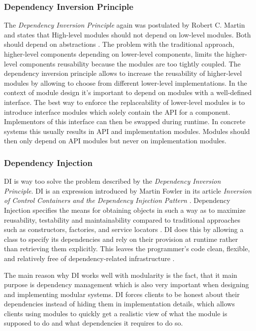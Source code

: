 \subsubsection{Dependency Inversion Principle}
The \textit{Dependency Inversion Principle} again was postulated by Robert C. Martin and states that High-level modules should not depend on low-level modules. Both should depend on abstractions \cite{Martin:2002}. The problem with the traditional approach, higher-level components depending on lower-level components, limits the higher-level components reusability because the modules are too tightly coupled. The dependency inversion principle allows to increase the reusability of higher-level modules by allowing to choose from different lower-level implementations. In the context of module design it's important to depend on modules with a well-defined interface. The best way to enforce the replaceability of lower-level modules is to introduce interface modules which solely contain the \gls{API} for a component. Implementors of this interface can then be swapped during runtime. In concrete systems this usually results in \gls{API} and implementation modules. Modules should then only depend on \gls{API} modules but never on implementation modules.

\subsubsection{Dependency Injection}
\gls{DI} is way too solve the problem described by the \textit{Dependency Inversion Principle}.
\gls{DI} is an expression introduced by Martin Fowler in its article \textit{Inversion of Control Containers and the Dependency Injection Pattern} \cite{Fowler:2004}. Dependency Injection specifies the means for obtaining objects in such a way as to maximize reusability, testability and maintainability compared to traditional approaches such as constructors, factories, and service locators \cite{JSR330}. \gls{DI} does this by allowing a class to specify its dependencies and rely on their provision at runtime rather than retrieving them explicitly. This leaves the programmer's code clean, flexible, and relatively free of dependency-related infrastructure \cite{JSR330}.

The main reason why \gls{DI} works well with modularity is the fact, that it main purpose is dependency management which is also very important when designing and implementing modular systems. \gls{DI} forces clients to be honest about their dependencies instead of hiding them in implementation details, which allows clients using modules to quickly get a realistic view of what the module is supposed to do and what dependencies it requires to do so.


